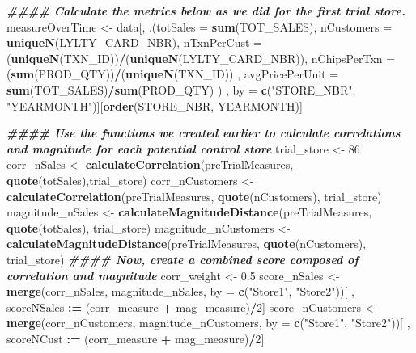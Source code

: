 \documentclass[
]{article}
\newenvironment{Shaded}{\begin{snugshade}}{\end{snugshade}}
\newcommand{\AttributeTok}[1]{\textcolor[rgb]{0.13,0.29,0.53}{#1}}
\newcommand{\DecValTok}[1]{\textcolor[rgb]{0.00,0.00,0.81}{#1}}
\newcommand{\DocumentationTok}[1]{\textcolor[rgb]{0.56,0.35,0.01}{\textbf{\textit{#1}}}}
\newcommand{\FloatTok}[1]{\textcolor[rgb]{0.00,0.00,0.81}{#1}}
\newcommand{\FunctionTok}[1]{\textcolor[rgb]{0.13,0.29,0.53}{\textbf{#1}}}
\newcommand{\NormalTok}[1]{#1}
\newcommand{\OtherTok}[1]{\textcolor[rgb]{0.56,0.35,0.01}{#1}}
\newcommand{\SpecialCharTok}[1]{\textcolor[rgb]{0.81,0.36,0.00}{\textbf{#1}}}
\newcommand{\StringTok}[1]{\textcolor[rgb]{0.31,0.60,0.02}{#1}}
\begin{document}
\begin{Shaded}
\begin{Highlighting}[]
\DocumentationTok{\#\#\#\# Calculate the metrics below as we did for the first trial store.}
\NormalTok{measureOverTime }\OtherTok{\textless{}{-}}\NormalTok{ data[, .(}\AttributeTok{totSales =} \FunctionTok{sum}\NormalTok{(TOT\_SALES),}
                            \AttributeTok{nCustomers =} \FunctionTok{uniqueN}\NormalTok{(LYLTY\_CARD\_NBR),}
                            \AttributeTok{nTxnPerCust =}\NormalTok{ (}\FunctionTok{uniqueN}\NormalTok{(TXN\_ID))}\SpecialCharTok{/}\NormalTok{(}\FunctionTok{uniqueN}\NormalTok{(LYLTY\_CARD\_NBR)),}
                            \AttributeTok{nChipsPerTxn =}\NormalTok{ (}\FunctionTok{sum}\NormalTok{(PROD\_QTY))}\SpecialCharTok{/}\NormalTok{(}\FunctionTok{uniqueN}\NormalTok{(TXN\_ID)) , }
                            \AttributeTok{avgPricePerUnit =} \FunctionTok{sum}\NormalTok{(TOT\_SALES)}\SpecialCharTok{/}\FunctionTok{sum}\NormalTok{(PROD\_QTY) ) , by }\OtherTok{=} \FunctionTok{c}\NormalTok{(}\StringTok{"STORE\_NBR"}\NormalTok{, }\StringTok{"YEARMONTH"}\NormalTok{)][}\FunctionTok{order}\NormalTok{(STORE\_NBR, YEARMONTH)]}

\DocumentationTok{\#\#\#\# Use the functions we created earlier to calculate correlations and magnitude for each potential control store}
\NormalTok{trial\_store }\OtherTok{\textless{}{-}} \DecValTok{86}
\NormalTok{corr\_nSales }\OtherTok{\textless{}{-}} \FunctionTok{calculateCorrelation}\NormalTok{(preTrialMeasures, }\FunctionTok{quote}\NormalTok{(totSales),trial\_store)}
\NormalTok{corr\_nCustomers }\OtherTok{\textless{}{-}} \FunctionTok{calculateCorrelation}\NormalTok{(preTrialMeasures, }\FunctionTok{quote}\NormalTok{(nCustomers), trial\_store)}
\NormalTok{magnitude\_nSales }\OtherTok{\textless{}{-}} \FunctionTok{calculateMagnitudeDistance}\NormalTok{(preTrialMeasures, }\FunctionTok{quote}\NormalTok{(totSales), trial\_store)}
\NormalTok{magnitude\_nCustomers }\OtherTok{\textless{}{-}} \FunctionTok{calculateMagnitudeDistance}\NormalTok{(preTrialMeasures, }\FunctionTok{quote}\NormalTok{(nCustomers), trial\_store)}
\DocumentationTok{\#\#\#\# Now, create a combined score composed of correlation and magnitude}
\NormalTok{corr\_weight }\OtherTok{\textless{}{-}} \FloatTok{0.5}
\NormalTok{score\_nSales }\OtherTok{\textless{}{-}} \FunctionTok{merge}\NormalTok{(corr\_nSales, magnitude\_nSales, }\AttributeTok{by =} \FunctionTok{c}\NormalTok{(}\StringTok{"Store1"}\NormalTok{, }\StringTok{"Store2"}\NormalTok{))[ , scoreNSales }\SpecialCharTok{:=}\NormalTok{ (corr\_measure }\SpecialCharTok{+}\NormalTok{ mag\_measure)}\SpecialCharTok{/}\DecValTok{2}\NormalTok{]}
\NormalTok{score\_nCustomers }\OtherTok{\textless{}{-}} \FunctionTok{merge}\NormalTok{(corr\_nCustomers, magnitude\_nCustomers, }\AttributeTok{by =} \FunctionTok{c}\NormalTok{(}\StringTok{"Store1"}\NormalTok{, }\StringTok{"Store2"}\NormalTok{))[ , scoreNCust }\SpecialCharTok{:=}\NormalTok{ (corr\_measure }\SpecialCharTok{+}\NormalTok{ mag\_measure)}\SpecialCharTok{/}\DecValTok{2}\NormalTok{]}


\end{Highlighting}
\end{Shaded}
\end{document}
